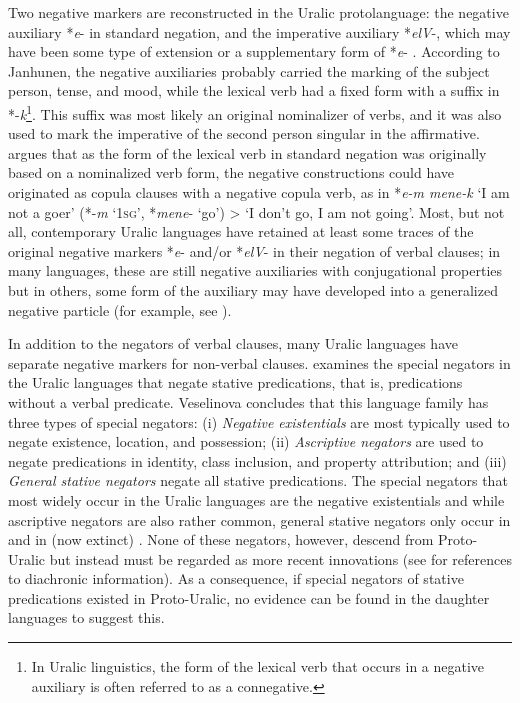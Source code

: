 \documentclass[output=paper]{langsci/langscibook}
\begin{document}
Two negative markers are reconstructed in the Uralic protolanguage: the negative auxiliary *\textit{e}- in standard negation, and the imperative auxiliary *\textit{elV}-, which may have been some type of extension or a supplementary form of *\textit{e}- \citep[37]{Janhunen1982}. According to Janhunen, the negative auxiliaries probably carried the marking of the subject person, tense, and mood, while the lexical verb had a fixed form with a suffix in *-\textit{k}\footnote{In Uralic linguistics, the form of the lexical verb that occurs in a negative auxiliary is often referred to as a connegative.}. This suffix was most likely an original nominalizer of verbs, and it was also used to mark the imperative of the second person singular in the affirmative. \citet[241--242]{Honti1997} argues that as the form of the lexical verb in standard negation was originally based on a nominalized verb form, the negative constructions could have originated as copula clauses with a negative copula verb, as in *\textit{e-m mene-k} `I am not a goer' (*-\textit{m} `1\textsc{sg}', *\textit{mene}- `go') > `I don't go, I am not going'. Most, but not all, contemporary Uralic languages have retained at least some traces of the original negative markers *\textit{e}- and/or *\textit{elV}- in their negation of verbal clauses; in many languages, these are still negative auxiliaries with conjugational properties but in others, some form of the auxiliary may have developed into a generalized negative particle (for example, see \citealt{Comrie1981}).

  In addition to the negators of verbal clauses, many Uralic languages have separate negative markers for non-verbal clauses. \citet{Veselinova2015} examines the special negators in the Uralic languages that negate stative predications, that is, predications without a verbal predicate. Veselinova concludes that this language family has three types of special negators: (i) \textit{Negative existentials} are most typically used to negate existence, location, and possession; (ii) \textit{Ascriptive negators} are used to negate predications in identity, class inclusion, and property attribution; and (iii) \textit{General stative negators} negate all stative predications. The special negators that most widely occur in the Uralic languages are the negative existentials and while ascriptive negators are also rather common, general stative negators only occur in  and in (now extinct) . None of these negators, however, descend from Proto-Uralic but instead must be regarded as more recent innovations (see \citealt[567--568, 570--571, 572]{Veselinova2015} for references to diachronic information). As a consequence, if special negators of stative predications existed in Proto-Uralic, no evidence can be found in the daughter languages to suggest this.
\end{document}
